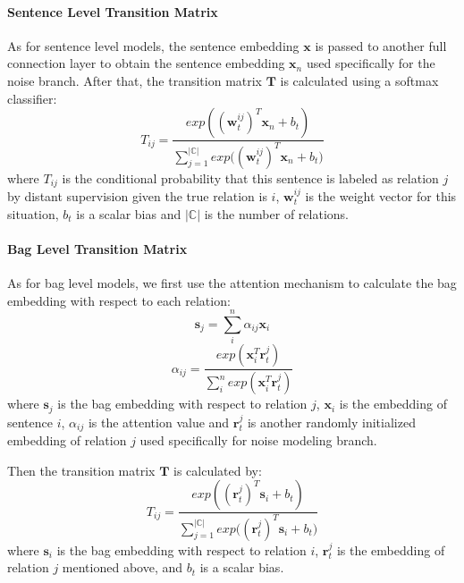 \documentclass[11pt,a4paper]{article}
\begin{document}
\paragraph{Sentence Level Transition Matrix}
As for sentence level models, the sentence embedding $\mathbf{x}$ is passed to another full connection layer to obtain the sentence embedding $\mathbf{x}_n$ used specifically for the noise branch. After that, the transition matrix $\mathbf{T}$ is calculated using a softmax classifier:
\begin{equation}
T_{ij} = \frac{exp({(\mathbf{w}_t^{ij})^T \mathbf{x}_n + b_t})}{\sum_{j=1}^{|\mathbb{C}|}{exp({(\mathbf{w}_t^{ij})^T \mathbf{x}_n + b_t}})}
\end{equation}
where $T_{ij}$ is the conditional probability that this sentence is labeled as relation $j$ by distant supervision given the true relation is $i$, $\mathbf{w}_t^{ij}$ is the weight vector for this situation, $b_t$ is a scalar bias and $|\mathbb{C}|$ is the number of relations.

\paragraph{Bag Level Transition Matrix}
As for bag level models, we first use the attention mechanism to calculate the bag embedding with respect to each relation:
\begin{equation}
\mathbf{s}_{j} = \sum_i^{n}{\alpha_{ij} \mathbf{x}_{i}}
\end{equation}
\begin{equation}
\alpha_{ij} = \frac{exp(\mathbf{x}_i^T \mathbf{r}_t^j)}{\sum_i^n{exp(\mathbf{x}_i^T \mathbf{r}_t^j)}}
\end{equation}
where $\mathbf{s}_j$ is the bag embedding with respect to relation $j$, $\mathbf{x}_i$ is the embedding of sentence $i$, $\alpha_{ij}$ is the attention value and $\mathbf{r}_t^j$ is another randomly initialized embedding of relation $j$ used specifically for noise modeling branch. 

Then the transition matrix $\mathbf{T}$ is calculated by:
\begin{equation}
T_{ij} = \frac{exp({(\mathbf{r}_t^j)^T \mathbf{s}_i + b_t})}{\sum_{j=1}^{|\mathbb{C}|}{exp((\mathbf{r}_t^j)^T \mathbf{s}_i + b_t})}
\end{equation}
where $\mathbf{s}_i$ is the bag embedding with respect to relation $i$, $\mathbf{r}_t^j$ is the embedding of relation $j$ mentioned above, and $b_t$ is a scalar bias. 
\end{document}
